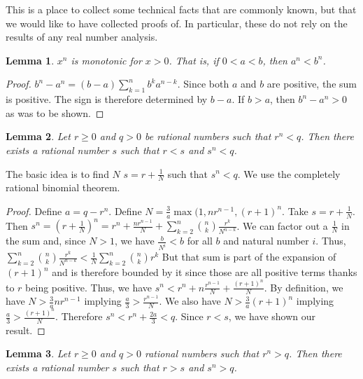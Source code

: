 \documentclass[12pt]{article}
\newtheorem{lemma}{Lemma}
\theoremstyle{remark}
\begin{document}
This is a place to collect some technical facts that are commonly known, but that we would like to have collected proofs of. In particular, these do not rely on the results of any real number analysis. 

\begin{lemma}
$x^n$ is monotonic for $x>0$. That is, if $0 < a < b$, then $a^n<b^n$.
\end{lemma}

\begin{proof}
$b^n-a^n= (b-a)\sum_{k=1}^n b^k a^{n-k}$. Since both $a$ and $b$ are positive, the sum is positive. The sign is therefore determined by $b-a$. If $b>a$, then $b^n-a^n > 0$ as was to be shown. 
\end{proof}

\begin{lemma}
Let $r \geq 0 $ and $q > 0$ be rational numbers such that $r^n < q$. Then there exists a rational number $s$ such that $r < s$ and $s^n < q$.
\end{lemma}

The basic idea is to find $N$ $s = r + \tfrac{1}{N}$ such that $s^n < q$. We use the completely rational binomial theorem.  

\begin{proof}
Define $a = q - r^n$. Define $N = \tfrac{3}{a} \max(1,n r^{n-1}, (r+1)^n$.  Take $s = r + \tfrac{1}{N}$. Then $s^n = (r+ \tfrac{1}{N})^n = r^n + \tfrac{n r^{n-1}}{N} + \sum_{k=2}^{n} \binom{n}{k} \tfrac{r^k}{N^{n-k}}$. We can factor out a $\tfrac{1}{N}$ in the sum and, since $N > 1$, we have $\tfrac{b}{N^i} < b$ for all $b$ and natural number $i$. Thus, $\sum_{k=2}^{n} \binom{n}{k} \tfrac{r^k}{N^{n-k}} < \tfrac{1}{N} \sum_{k=2}^{n} \binom{n}{k} r^k$  But that sum is part of the expansion of $(r+1)^n$ and is therefore bounded by it since those are all positive terms thanks to $r$ being positive. Thus, we have $s^n < r^n + n \tfrac{r^{n-1}}{N} + \tfrac{ (r+1)^n }{N}$.  By definition, we have $N > \tfrac{3}{a} n r^{n-1}$ implying $\tfrac{a}{3} > \tfrac{ r^{n-1}}{N}$. We also have $N > \tfrac{3}{a} (r+1)^n$ implying $\tfrac{a}{3} > \tfrac{(r+1)^n}{N}$. Therefore $s^n < r^n + \tfrac{2 a}{3} < q$. Since $r<s$, we have shown our result. 
\end{proof}

\begin{lemma}
Let $r \geq 0 $ and $q > 0$ rational numbers such that $r^n > q$. Then there exists a rational number $s$ such that $r > s$ and $s^n > q$.
\end{lemma}
\end{document}
